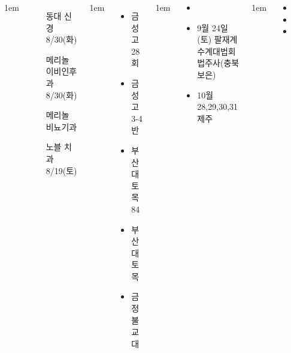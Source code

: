 \documentclass[	20pt, 
							a1paper, 
							portrait, %
							margin=0mm, %
							innermargin=10mm,  		%
							blockverticalspace=4mm, %
							colspace=5mm, 
							subcolspace=0mm
							]{tikzposter}
\begin{document}
\begin{columns}
{\begin{itemize}
					\end{itemize}
			}



			{
					\setlength{\leftmargini}{10em}
					\setlength{\labelsep} {1em}
					\begin{itemize}
					\item [동대 신경] 8/30(화)
					\item [메리놀 이비인후과] 8/30(화)
					\item [메리놀 비뇨기과] 
					\item [노블 치과] 8/19(토)
					\end{itemize}
			}


			{
					\setlength{\leftmargini}{4em}
					\setlength{\labelsep} {1em}
					\begin{itemize}
					\item  금성고28회
					\item  금성고3-4반 
					\item  부산대 토목84
					\item  부산대 토목
					\item  금정 불교대
					\end{itemize}
			} %


			{
					\setlength{\leftmargini}{4em}
					\setlength{\labelsep} {1em}
					\begin{itemize}
					\item  
					\item  9월 24일 (토)  팔재계 수계대법회 법주사(충북보은)
					\item  10월 28,29,30,31 제주
					\end{itemize}
			} %

			{
					\setlength{\leftmargini}{4em}
					\setlength{\labelsep} {1em}
					\begin{itemize}
					\item  
					\item  
					\item  
					\end{itemize}
			} %



\end{columns}
\end{document}
